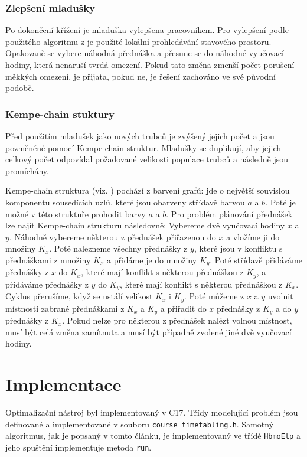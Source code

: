 \documentclass[12pt, a4paper]{article}
\def\CC{{C\nolinebreak[4]\hspace{-.05em}\raisebox{.4ex}{\tiny\bf ++}}}
\begin{document}
\subsubsection{Zlepšení mladušky}
Po dokončení křížení je mladuška vylepšena pracovníkem.
Pro vylepšení podle použitého algoritmu z \cite{HoneyBee} je použité lokální prohledávání stavového prostoru.
Opakovaně se vybere náhodná přednáška a přesune se do náhodné vyučovací hodiny, která nenaruší tvrdá omezení.
Pokud tato změna zmenší počet porušení měkkých omezení, je přijata, pokud ne, je řešení zachováno ve své původní podobě.

\subsubsection{Kempe-chain stuktury}
Před použitím mladušek jako nových trubců je zvýšený jejich počet a jsou pozměněné pomocí Kempe-chain struktur.
Mladušky se duplikují, aby jejich celkový počet odpovídal požadované velikosti populace trubců a následně jsou promíchány.

Kempe-chain struktura (viz. \cite{Kempe})
pochází z barvení grafů: jde o největší souvislou komponentu sousedících uzlů, které jsou obarveny střídavě barvou $a$ a $b$. Poté je možné v této struktuře prohodit barvy $a$ a $b$.
Pro problém plánování přednášek lze najít Kempe-chain strukturu následovně:
Vybereme dvě vyučovací hodiny $x$ a $y$. Náhodně vybereme některou z přednášek přiřazenou do $x$ a vložíme ji do množiny $K_x$. Poté nalezneme všechny přednášky z $y$, které jsou v konfliktu s přednáškami z množiny $K_x$ a přidáme je do množiny $K_y$.
Poté střídavě přidáváme přednášky z $x$ do $K_x$, které mají konflikt s některou přednáškou z $K_y$, a přidáváme přednášky z $y$ do $K_y$, které mají konflikt s některou přednáškou z $K_x$.
Cyklus přerušíme, když se ustálí velikost $K_x$ i $K_y$. Poté můžeme z $x$ a $y$ uvolnit místnosti zabrané přednáškami z $K_x$ a $K_y$ a přiřadit do $x$ přednášky z $K_y$ a do $y$ přednášky z $K_x$.
Pokud nelze pro některou z přednášek nalézt volnou místnost, musí být celá změna zamítnuta a musí být případně zvolené jiné dvě vyučovací hodiny.

\section{Implementace}
Optimalizační nástroj byl implementovaný v \CC{}17.
Třídy modelující problém jsou definované a implementované v souboru \texttt{course_timetabling.h}.
Samotný algoritmus, jak je popsaný v tomto článku, je implementovaný ve třídě \texttt{HbmoEtp} a jeho spuštění
implementuje metoda \texttt{run}.
\end{document}
